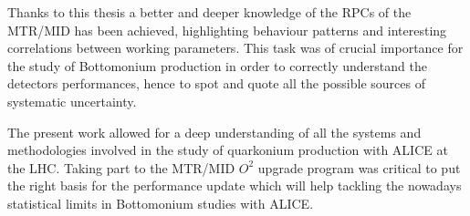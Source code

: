 Thanks to this thesis a better and deeper knowledge of the RPCs of the MTR/MID has been achieved, highlighting behaviour patterns and interesting correlations between working parameters.
This task was of crucial importance for the study of Bottomonium production in order to correctly understand the detectors performances, hence to spot and quote all the possible sources of systematic uncertainty.


The present work allowed for a deep understanding of all the systems and methodologies involved in the study of quarkonium production with ALICE at the LHC.
Taking part to the MTR/MID $O^2$ upgrade program was critical to put the right basis for the performance update which will help tackling the nowadays statistical limits in Bottomonium studies with ALICE.


